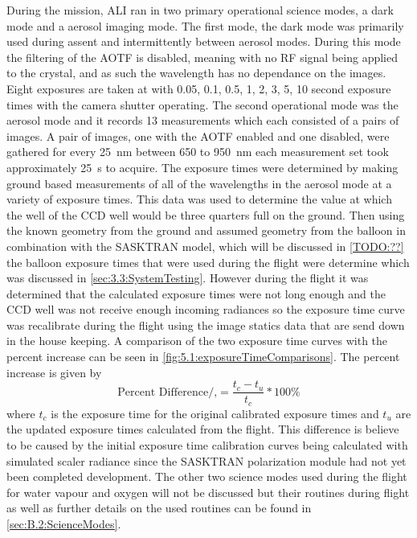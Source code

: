 During the mission, ALI ran in two primary operational science modes, a dark mode and a aerosol imaging mode. The first mode, the dark mode was primarily used during assent and intermittently between aerosol modes. During this mode the filtering of the AOTF is disabled, meaning with no RF signal being applied to the crystal, and as such the wavelength has no dependance on the images. Eight exposures are taken at with 0.05, 0.1, 0.5, 1, 2, 3, 5, 10 second exposure times with the camera shutter operating. The second operational mode was the aerosol mode and it records 13 measurements which each consisted of a pairs of images. A pair of images, one with the AOTF enabled and one disabled, were gathered for every 25~nm between 650 to 950~nm each measurement set took approximately 25~s to acquire. The exposure times were determined by making ground based measurements of all of the wavelengths in the aerosol mode at a variety of exposure times. This data was used to determine the value at which the well of the CCD well would be three quarters full on the ground. Then using the known geometry from the ground and assumed geometry from the balloon in combination with the SASKTRAN model, which will be discussed in \autoref{TODO:??} the balloon exposure times that were used during the flight were determine which was discussed in \autoref{sec:3.3:SystemTesting}. However during the flight it was determined that the calculated exposure times were not long enough and the CCD well was not receive enough incoming radiances so the exposure time curve was recalibrate during the flight using the image statics data that are send down in the house keeping. A comparison of the two exposure time curves with the percent increase can be seen in \autoref{fig:5.1:exposureTimeComparisons}. The percent increase is given by
\begin{equation}
    \text{Percent Difference/,} = \frac{t_{c}-t_{u}}{t_{c}}*100\%
\end{equation}
where $t_{c}$ is the exposure time for the original calibrated exposure times and $t_{u}$ are the updated exposure times calculated from the flight. This difference is believe to be caused by the initial exposure time calibration curves being calculated with simulated scaler radiance since the SASKTRAN polarization module had not yet been completed development. The other two science modes used during the flight for water vapour and oxygen will not be discussed but their routines during flight as well as further details on the used routines can be found in \autoref{sec:B.2:ScienceModes}. %


